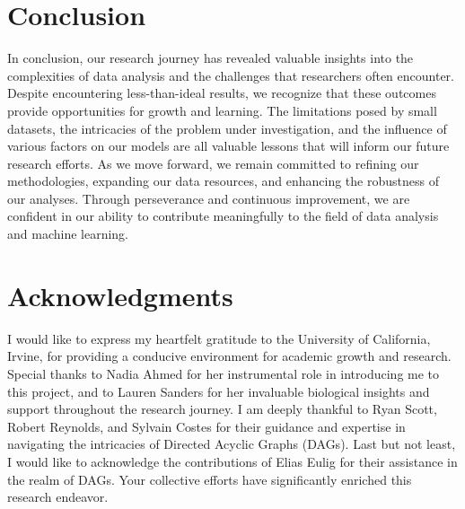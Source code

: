 \documentclass{article}
\begin{document}
\section{Conclusion}

In conclusion, our research journey has revealed valuable insights into the complexities of data analysis and the challenges that researchers often encounter. Despite encountering less-than-ideal results, we recognize that these outcomes provide opportunities for growth and learning. The limitations posed by small datasets, the intricacies of the problem under investigation, and the influence of various factors on our models are all valuable lessons that will inform our future research efforts. As we move forward, we remain committed to refining our methodologies, expanding our data resources, and enhancing the robustness of our analyses. Through perseverance and continuous improvement, we are confident in our ability to contribute meaningfully to the field of data analysis and machine learning.

\section*{Acknowledgments}

I would like to express my heartfelt gratitude to the University of California, Irvine, for providing a conducive environment for academic growth and research. Special thanks to Nadia Ahmed for her instrumental role in introducing me to this project, and to Lauren Sanders for her invaluable biological insights and support throughout the research journey. I am deeply thankful to Ryan Scott, Robert Reynolds, and Sylvain Costes for their guidance and expertise in navigating the intricacies of Directed Acyclic Graphs (DAGs). Last but not least, I would like to acknowledge the contributions of Elias Eulig for their assistance in the realm of DAGs. Your collective efforts have significantly enriched this research endeavor.
\end{document}
